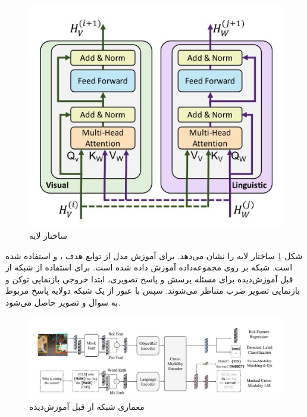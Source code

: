	\begin{figure}
		\centerline{\includegraphics[scale=0.6]{images/coattentional.JPG}}
		\caption[ساختار لایه ]{ساختار لایه \cite{lu2019vilbert}}
		\label{fig:coattentional}
	\end{figure}
	شکل 
	\ref{fig:coattentional}
	ساختار لایه
	را نشان می‌دهد. برای آموزش مدل
	از توابع هدف
	،
	و 
	استفاده شده است. شبکه
	بر روی مجموعه‌داده
	آموزش داده شده است. برای استفاده از شبکه از قبل آموزش‌دیده
	برای مسئله پرسش و پاسخ تصویری، ابتدا خروجی بازنمایی توکن
	\lr{[CLS]}
	و بازنمایی تصویر ضرب متناظر می‌شوند. سپس با عبور از یک شبکه 
	دولایه پاسخ مربوط به سوال و تصویر حاصل می‌شود.
	
	\begin{figure}
		\centerline{\includegraphics[scale=0.6]{images/LXMERT.JPG}}
		\caption[ معماری شبکه از قبل آموزش‌دیده ]{معماری شبکه از قبل آموزش‌دیده \cite{tan2019lxmert}}
		\label{fig:LXMERT}
	\end{figure}
	
